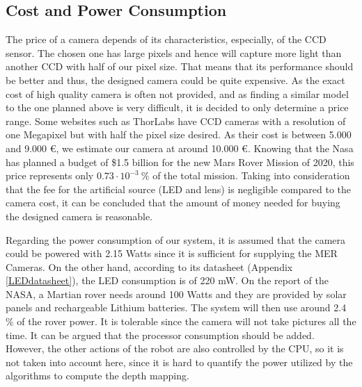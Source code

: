 \subsection{Cost and Power Consumption}
The price of a camera depends of its characteristics, especially, of the CCD sensor. The chosen one has large pixels and hence will capture more light than another CCD with half of our pixel size. That means that its performance should be better and thus, the designed camera could be quite expensive. As the exact cost of high quality camera is often not provided, and as finding a similar model to the one planned above is very difficult, it is decided to only determine a price range. Some websites such as ThorLabs have CCD cameras with a resolution of one Megapixel but with half the pixel size desired. As their cost is between 5.000 and 9.000 \euro, we estimate our camera at around 10.000 \euro. Knowing that the Nasa has planned a budget of \$1.5 billion for the new Mars Rover Mission of 2020, this price represents only $0.73\cdot 10^{-3} \ \%$ of the total mission. Taking into consideration that the fee for the artificial source (LED and lens) is negligible compared to the camera cost, it can be concluded that the amount of money needed for buying the designed camera is reasonable.

Regarding the power consumption of our system, it is assumed that the camera could be powered with 2.15 Watts since it is sufficient for supplying the MER Cameras. On the other hand, according to its datasheet (Appendix \ref{LEDdatasheet}), the LED consumption is of 220 mW. On the report of the NASA, a Martian rover needs around 100 Watts and they are provided by solar panels and rechargeable Lithium batteries. The system will then use around 2.4 \% of the rover power. It is tolerable since the camera will not take pictures all the time. It can be argued that the processor consumption should be added. However, the other actions of the robot are also controlled by the CPU, so it is not taken into account here, since it is hard to quantify the power utilized by the algorithms to compute the depth mapping.